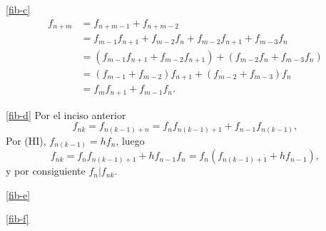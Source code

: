 \documentclass[a4paper,12pt,twoside,spanish,reqno]{amsbook}
\numberwithin{equation}{section}
\begin{document}
\begin{enumerate}
\ref{fib-c}
\begin{align*}
    f_{n+m} &= f_{n+m -1} +f_{n+m-2} \\
            &= f_{m-1}f_{n+1}+f_{m-2}f_{n}  + f_{m-2}f_{n+1}+f_{m-3}f_{n} \\
            &= (f_{m-1}f_{n+1}  + f_{m-2}f_{n+1})+(f_{m-2}f_{n}+f_{m-3}f_{n}) \\
            &= (f_{m-1} + f_{m-2})f_{n+1}+(f_{m-2}+f_{m-3})f_{n} \\
            &= f_{m}f_{n+1}+f_{m-1}f_{n}.
\end{align*}

\ref{fib-d}
Por el inciso anterior
$$
f_{nk} = f_{n(k-1) + n} =  f_{n}f_{n(k-1)+1}+f_{n-1}f_{n(k-1)},
$$
Por (HI), $f_{n(k-1)} = hf_n$, luego
$$
f_{nk} =  f_{n}f_{n(k-1)+1}+hf_{n-1}f_n =  f_{n}(f_{n(k-1)+1}+hf_{n-1}),
$$
y por consiguiente $f_{n}| f_{nk}$. 

\ref{fib-e}

\ref{fib-f}
\end{enumerate}
\end{document}
